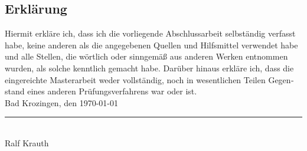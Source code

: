 \begin{otherlanguage}{german}
\section*{Erklärung} 
Hiermit erkläre ich, dass ich die vorliegende Abschlussarbeit selbständig verfasst habe, 
keine anderen als die angegebenen Quellen und Hilfsmittel verwendet habe 
und alle Stellen, die wörtlich oder sinngemäß aus anderen Werken entnommen wurden, als solche kenntlich gemacht habe. 
Darüber hinaus erkläre ich, dass die eingereichte Masterarbeit weder vollständig, noch in wesentlichen Teilen 
Gegenstand eines anderen Prüfungsverfahrens war oder ist.\\[10mm]
Bad Krozingen, den \today

\vspace*{10mm}
\rule{60mm}{0.4pt}\\
Ralf Krauth
\end{otherlanguage}
